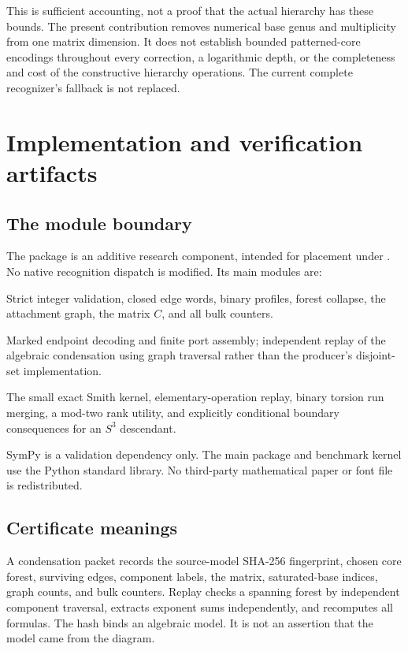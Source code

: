\documentclass[11pt]{article}
\theoremstyle{definition}
\theoremstyle{remark}
\newcommand{\code}[1]{\texttt{#1}}
\begin{document}
This is sufficient accounting, not a proof that the actual hierarchy has
these bounds. The present contribution removes numerical base genus and
multiplicity from one matrix dimension. It does not establish bounded
patterned-core encodings throughout every correction, a logarithmic depth,
or the completeness and cost of the constructive hierarchy operations.
The current complete recognizer's fallback is not replaced.

\section{Implementation and verification artifacts}
\label{sec:implementation}

\subsection{The module boundary}
The package is an additive research component, intended for placement under
. No native
recognition dispatch is modified. Its main modules are:
\begin{description}[style=nextline]
\item[\code{model.py} and \code{condense.py}]
Strict integer validation, closed edge words, binary profiles, forest
collapse, the attachment graph, the matrix $C$, and all bulk counters.
\item[\code{ports.py} and \code{replay.py}]
Marked endpoint decoding and finite port assembly; independent replay of the
algebraic condensation using graph traversal rather than the producer's
disjoint-set implementation.
\item[\code{smith.py} and \code{boundary.py}]
The small exact Smith kernel, elementary-operation replay, binary torsion
run merging, a mod-two rank utility, and explicitly conditional boundary
consequences for an $S^3$ descendant.
\end{description}
SymPy is a validation dependency only. The main package and benchmark kernel
use the Python standard library. No third-party mathematical paper or font
file is redistributed.

\subsection{Certificate meanings}
A condensation packet records the source-model SHA-256 fingerprint, chosen
core forest, surviving edges, component labels, the matrix, saturated-base
indices, graph counts, and bulk counters. Replay checks a spanning forest
by independent component traversal, extracts exponent sums independently,
and recomputes all formulas. The hash binds an algebraic model. It is not
an assertion that the model came from the diagram.
\end{document}
